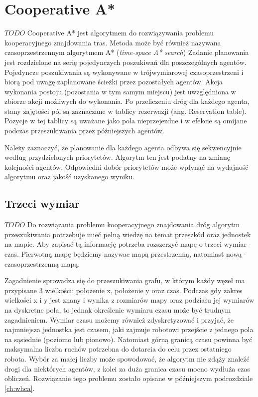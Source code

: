 \section{Cooperative A*}
$TODO$
Cooperative A* jest algorytmem do rozwiązywania problemu kooperacyjnego znajdowania tras.
Metoda może być również nazywana czasoprzestrzennym algorytmem A* ({\it time-space A* search})
Zadanie planowania jest rozdzielone na serię pojedynczych poszukiwań dla poszczególnych agentów.
Pojedyncze poszukiwania są wykonywane w trójwymiarowej czasoprzestrzeni i biorą pod uwagę zaplanowane ścieżki przez pozostałych agentów.
Akcja wykonania postoju (pozostania w tym samym miejscu) jest uwzględniona w zbiorze akcji możliwych do wykonania.
Po przeliczeniu dróg dla każdego agenta, stany zajętości pól są zaznaczane w tablicy rezerwazji (ang. Reservation table).
Pozycje w tej tablicy są uważane jako pola nieprzejezdne i w efekcie są omijane podczas przeszukiwania przez późniejszych agentów. \cite{cooppath}

Należy zaznaczyć, że planowanie dla każdego agenta odbywa się sekwencyjnie według przydzielonych priorytetów.
Algorytm ten jest podatny na zmianę kolejności agentów. Odpowiedni dobór priorytetów może wpłynąć na wydajność algorytmu oraz jakość uzyskanego wyniku.

\subsection{Trzeci wymiar}
$TODO$
Do rozwiązania problemu kooperacyjnego znajdowania dróg algorytm przeszukiwania potrzebuje mieć pełną wiedzę na temat przeszkód oraz jednostek na mapie.
Aby zapisać tą informację potrzeba rozszerzyć mapę o trzeci wymiar - czas. 
Pierwotną mapę będziemy nazywac mapą przestrzenną, natomiast nową - czasoprzestrzenną mapą. \cite{cooppath}

Zagadnienie sprowadza się do przeszukiwania grafu, w którym każdy węzeł ma przypisane 3 wielkości: położenie x, położenie y oraz czas.
Podczas gdy zakres wielkości x i y jest znany i wynika z rozmiarów mapy oraz podziału jej wymiarów na dyskretne pola, to jednak określenie wymiaru czasu może być trudnym zagadnieniem.
Wymiar czasu możemy również zdyskretyzować i przyjać, że najmniejsza jednostka jest czasem, jaki zajmuje robotowi przejście z jednego pola na sąsiednie (poziomo lub pionowo). Natomiast górną granicą czasu powinna być maksymalna liczba ruchów potrzebna do dotarcia do celu przez ostatniego robota. Wybór za małej liczby może spowodować, że algorytm nie zdąży znaleźć drogi dla niektórych agentów, z kolei za duża granica czasu mocno wydłuża czas obliczeń. Rozwiązanie tego problemu zostało opisane w późniejszym podrozdziale \ref{ch:whca}.

